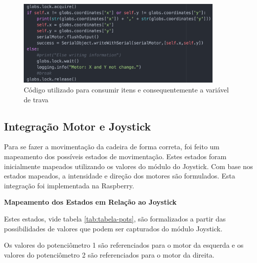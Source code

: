   \begin{figure}[!htb]
  \centering
  \includegraphics[width=0.9\textwidth]{figuras/resultados/motor_lock}
  \caption{Código utilizado para consumir itens e consequentemente a variável de trava}
  \label{fig:motor_lock}
  \end{figure}


\subsection{Integração Motor e Joystick}

Para se fazer a movimentação da cadeira de forma correta, foi feito um mapeamento dos possíveis estados de movimentação. Estes estados foram inicialmente mapeados utilizando os valores do módulo do Joystick. Com base nos estados mapeados, a intensidade e direção dos motores são formulados. Esta integração foi implementada na Raspberry.

  \textbf{Mapeamento dos Estados em Relação ao Joystick}

  Estes estados, vide tabela \ref{tab:tabela-pots}, são formalizados a partir das possibilidades de valores que podem ser capturados do módulo Joystick.

  Os valores do potenciômetro 1 são referenciados para o motor da esquerda e os valores do potenciômetro 2 são referenciados para o motor da direita.

  \begin{table}[!ht]
  \centering
  \caption{Mapeamento dos estados conforme valores do Joystick}
  \label{tab:tabela-pots}
  \end{table}

